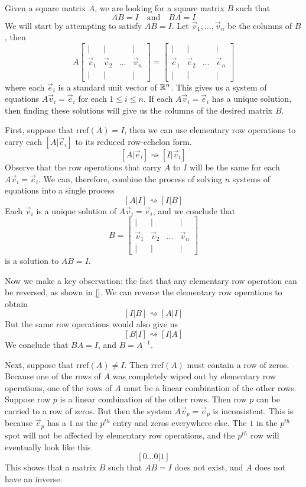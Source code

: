 \documentclass{ximera}
\begin{document}
Given a square matrix $A$, we are looking for a square matrix $B$ such that $$AB=I\quad\text{and}\quad BA=I$$
We will start by attempting to satisfy $AB=I$.
Let $\vec{v}_1,\ldots,\vec{v}_n$ be the columns of $B$, then
$$A\begin{bmatrix}
           | & |& &|\\
		\vec{v}_1 & \vec{v}_2 &\dots &\vec{v}_n\\
		|&| & &|
         \end{bmatrix}=\begin{bmatrix}
           | & |& &|\\
		\vec{e}_1 & \vec{e}_2 &\dots &\vec{e}_n\\
		|&| & &|
         \end{bmatrix}$$
where each $\vec{e}_i$ is a standard unit vector of $\mathbb{R}^n$.   This gives us a system of equations $A\vec{v}_i=\vec{e}_i$ for each $1\leq i\leq n$.  If each $A\vec{v}_i=\vec{e}_i$ has a unique solution, then finding these solutions will give us the columns of the desired matrix $B$.  

First, suppose that $\mbox{rref}(A)=I$, then we can use elementary row operations to carry each $[A|\vec{e}_i]$ to its reduced row-echelon form.
$$[A|\vec{e}_i]\rightsquigarrow [I|\vec{v}_i]$$
Observe that the row operations that carry $A$ to $I$ will be the same for each $A\vec{v}_i=\vec{e}_i$.  We can, therefore, combine the process of solving $n$ systems of equations into a single process
$$[A|I]\rightsquigarrow [I|B]$$
Each $\vec{v}_i$ is a unique solution of $A\vec{v}_i=\vec{e}_i$, and we conclude that $$B=\begin{bmatrix}
           | & |& &|\\
		\vec{v}_1 & \vec{v}_2 &\dots &\vec{v}_n\\
		|&| & &|
         \end{bmatrix}$$ is a solution to $AB=I$.  
 
Now we make a key observation: the fact that any elementary row operation can be reversed, as shown in \ref{}.  We can reverse the elementary row operations to obtain
$$[I|B]\rightsquigarrow [A|I]$$
But the same row operations would also give us
$$[B|I]\rightsquigarrow [I|A]$$
We conclude that $BA=I$, and $B=A^{-1}$.
         
Next, suppose that $\mbox{rref}(A)\neq I$.  Then $\mbox{rref}(A)$ must contain a row of zeros.  Because one of the rows of $A$ was completely wiped out by elementary row operations, one of the rows of $A$ must be a linear combination of the other rows.  Suppose row $p$ is a linear combination of the other rows.  Then row $p$ can be carried to a row of zeros. But then the system $A\vec{v}_p=\vec{e}_p$ is inconsistent.  This is because $\vec{e}_p$ has a $1$ as the $p^{th}$ entry and zeros everywhere else.  The $1$ in the $p^{th}$ spot will not be affected by elementary row operations, and the $p^{th}$ row will eventually look like this
$$[0\ldots 0|1]$$
This shows that a matrix $B$ such that $AB=I$ does not exist, and $A$ does not have an inverse.
\end{document}

